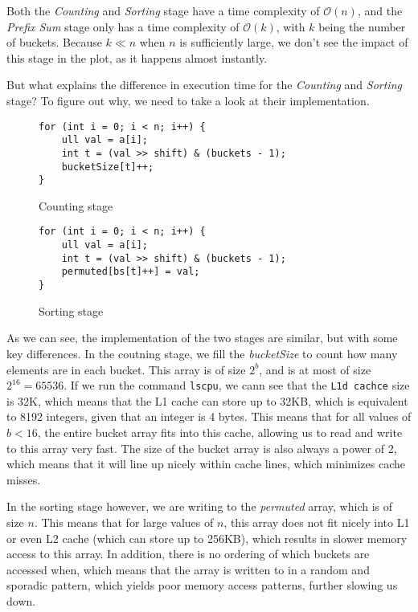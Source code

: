 \documentclass{article}
\begin{document}
Both the \textit{Counting} and \textit{Sorting} stage have a time complexity of \( \mathcal{O}\left(n\right) \), and the \textit{Prefix Sum} stage only has a time complexity of \( \mathcal{O}\left(k\right) \), with \( k \) being the number of buckets. Because \( k \ll n \) when \( n \) is sufficiently large, we don't see the impact of this stage in the plot, as it happens almost instantly.
\medskip

But what explains the difference in execution time for the \textit{Counting} and \textit{Sorting} stage? To figure out why, we need to take a look at their implementation.

\begin{figure}[h]
    \centering

    \begin{minipage}{0.47\textwidth}
        \begin{lstlisting}
for (int i = 0; i < n; i++) {
    ull val = a[i];
    int t = (val >> shift) & (buckets - 1);
    bucketSize[t]++;
}
        \end{lstlisting}
        \caption{Counting stage}
    \end{minipage}\hfill
    \begin{minipage}{0.47\textwidth}
        \begin{lstlisting}
for (int i = 0; i < n; i++) {
    ull val = a[i];                         
    int t = (val >> shift) & (buckets - 1);
    permuted[bs[t]++] = val;
}
        \end{lstlisting}
        \caption{Sorting stage}
    \end{minipage}
    \end{figure}

    As we can see, the implementation of the two stages are similar, but with some key differences. In the coutning stage, we fill the \textit{bucketSize} to count how many elements are in each bucket. This array is of size \( 2^{b} \), and is at most of size \( 2^{16} = 65536 \). If we run the command \texttt{lscpu}, we cann see that the \texttt{L1d cachce} size is 32K, which means that the L1 cache can store up to 32KB, which is equivalent to 8192 integers, given that an integer is 4 bytes. This means that for all values of \( b < 16\), the entire bucket array fits into this cache, allowing us to read and write to this array very fast. The size of the bucket array is also always a power of 2, which means that it will line up nicely within cache lines, which minimizes cache misses.
\medskip

In the sorting stage however, we are writing to the \textit{permuted} array, which is of size \( n \). This means that for large values of \( n \), this array does not fit nicely into L1 or even L2 cache (which can store up to 256KB), which results in slower memory access to this array. In addition, there is no ordering of which buckets are accessed when, which means that the array is written to in a random and sporadic pattern, which yields poor memory access patterns, further slowing us down.
\end{document}
